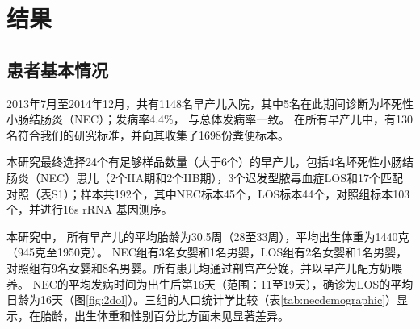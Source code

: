 \section{结果}
    \subsection{患者基本情况}
    2013年7月至2014年12月，共有1148名早产儿入院，其中5名在此期间诊断为坏死性小肠结肠炎（NEC）；发病率4.4\%， 与总体发病率一致\cite{rees2010national}。 在所有早产儿中，有130名符合我们的研究标准，并向其收集了1698份粪便标本。

    本研究最终选择24个有足够样品数量（大于6个）的早产儿，包括4名坏死性小肠结肠炎（NEC）患儿（2个IIA期和2个IIB期），3个迟发型脓毒血症LOS和17个匹配对照（表S1）；样本共192个，其中NEC标本45个，LOS标本44个，对照组标本103个，并进行16s rRNA 基因测序。

    本研究中， 所有早产儿的平均胎龄为30.5周（28至33周），平均出生体重为1440克（945克至1950克）。 NEC组有3名女婴和1名男婴，LOS组有2名女婴和1名男婴，对照组有9名女婴和8名男婴。所有患儿均通过剖宫产分娩，并以早产儿配方奶喂养。 NEC的平均发病时间为出生后第16天（范围：11至19天），确诊为LOS的平均日龄为16天（图\ref{fig:2dol}）。三组的人口统计学比较（表\ref{tab:necdemographic}）显示，在胎龄，出生体重和性别百分比方面未见显著差异。

